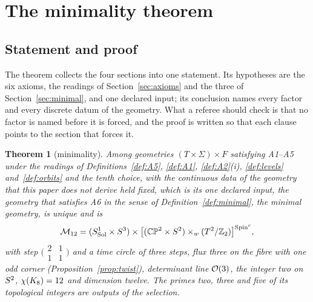 \documentclass[11pt,a4paper]{article}
\theoremstyle{plain}
\newtheorem{theorem}{Theorem}[section]
\theoremstyle{definition}
\theoremstyle{remark}
\newcommand{\Sol}{\mathrm{Sol}}
\begin{document}
\section{The minimality theorem}\label{sec:theorem}

\subsection{Statement and proof}

The theorem collects the four sections into one statement. Its hypotheses are the six axioms, the readings of Section~\ref{sec:axioms} and the three of Section~\ref{sec:minimal}, and one declared input; its conclusion names every factor and every discrete datum of the geometry. What a referee should check is that no factor is named before it is forced, and the proof is written so that each clause points to the section that forces it.

\begin{theorem}[minimality]\label{thm:main}
Among geometries $(T\times\Sigma)\times F$ satisfying A1--A5 under the readings of Definitions~\ref{def:A5}, \ref{def:A1}, \ref{def:A2}(i), \ref{def:levels} and~\ref{def:orbits}
and the tenth choice,
with the continuous data of the geometry that this paper does not derive held fixed, which is its one declared input, the geometry that satisfies A6 in the sense of Definition~\ref{def:minimal}, the minimal geometry, is unique and is
\[
\Mtwelve=(S^{1}_{\Sol}\times S^{3})\times\bigl[(\CPtwo\times\Stwo)\times_{w}(\Ttwo/\Ztwo)\bigr]^{\Spinc},
\]
with step $\bigl(\begin{smallmatrix}2&1\\1&1\end{smallmatrix}\bigr)$ and a time circle of three steps, flux three on the fibre with one odd corner (Proposition~\ref{prop:twist}), determinant line $\mathcal{O}(3)$,
the integer two on $S^2$,
$\chi(K_8)=12$ and dimension twelve. The primes two, three and five of its topological integers are outputs of the selection.
\end{theorem}
\end{document}
